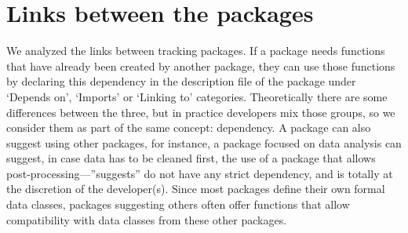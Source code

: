 \documentclass[a4paper,12pt]{article}
\newcommand{\Rpkg}[1]{\texttt{#1}}
\begin{document}
%
%
%

\section*{Links between the packages}
\label{section:links}

We analyzed the links between tracking packages. If a package needs functions that have already been created by another package, they can use those functions by declaring this dependency in the description file of the package under `Depends on', `Imports' or `Linking to' categories. Theoretically there are some differences between the three, but in practice developers mix those groups, so we consider them as part of the same concept: dependency. A package can also suggest using other packages, for instance, a package focused on data analysis can suggest, in case data has to be cleaned first, the use of a package that allows post-processing---''suggests'' do not have any strict dependency, and is totally at the discretion of the developer(s). Since most packages define their own formal data classes, packages suggesting others often offer functions that allow compatibility with data classes from these other packages. 
\end{document}
